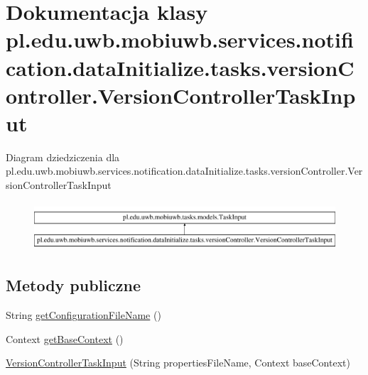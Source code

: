 \hypertarget{classpl_1_1edu_1_1uwb_1_1mobiuwb_1_1services_1_1notification_1_1data_initialize_1_1tasks_1_1versfd7a1936d3ced5297b4ed00a93d9b277}{}\section{Dokumentacja klasy pl.\+edu.\+uwb.\+mobiuwb.\+services.\+notification.\+data\+Initialize.\+tasks.\+version\+Controller.\+Version\+Controller\+Task\+Input}
\label{classpl_1_1edu_1_1uwb_1_1mobiuwb_1_1services_1_1notification_1_1data_initialize_1_1tasks_1_1versfd7a1936d3ced5297b4ed00a93d9b277}
Diagram dziedziczenia dla pl.\+edu.\+uwb.\+mobiuwb.\+services.\+notification.\+data\+Initialize.\+tasks.\+version\+Controller.\+Version\+Controller\+Task\+Input\begin{figure}[H]
\begin{center}
\leavevmode
\includegraphics[height=1.818182cm]{classpl_1_1edu_1_1uwb_1_1mobiuwb_1_1services_1_1notification_1_1data_initialize_1_1tasks_1_1versfd7a1936d3ced5297b4ed00a93d9b277}
\end{center}
\end{figure}
\subsection*{Metody publiczne}
\begin{DoxyCompactItemize}
\item 
String \hyperlink{classpl_1_1edu_1_1uwb_1_1mobiuwb_1_1services_1_1notification_1_1data_initialize_1_1tasks_1_1versfd7a1936d3ced5297b4ed00a93d9b277_a19f32d17ff57fe28c5db8070f86ebc6f}{get\+Configuration\+File\+Name} ()
\item 
Context \hyperlink{classpl_1_1edu_1_1uwb_1_1mobiuwb_1_1services_1_1notification_1_1data_initialize_1_1tasks_1_1versfd7a1936d3ced5297b4ed00a93d9b277_a85a495308ce84c644ccac23f0d38ab2a}{get\+Base\+Context} ()
\item 
\hyperlink{classpl_1_1edu_1_1uwb_1_1mobiuwb_1_1services_1_1notification_1_1data_initialize_1_1tasks_1_1versfd7a1936d3ced5297b4ed00a93d9b277_abda1eefae375bfde6022821f1964da3a}{Version\+Controller\+Task\+Input} (String properties\+File\+Name, Context base\+Context)
\end{DoxyCompactItemize}


